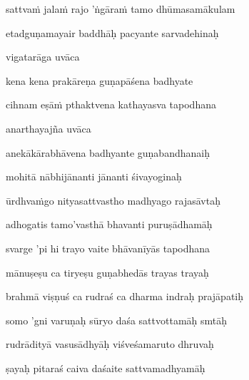 sattva\.m jala\.m rajo 'ṅgāra\.m tamo dhūmasamākulam\thinspace{\dandab} \dontdisplaylinenum

etadguṇamayair baddhāḥ pacyante sarvadehinaḥ \veg\dontdisplaylinenum

vigatarāga uvāca~{\dandab}\dontdisplaylinenum 

kena kena prakāreṇa guṇapāśena badhyate\thinspace{\danda} \dontdisplaylinenum

cihnam eṣā\.m pthaktvena kathayasva tapodhana \veg\dontdisplaylinenum

anarthayajña uvāca~{\dandab}\dontdisplaylinenum 

anekākārabhāvena badhyante guṇabandhanaiḥ\thinspace{\danda} \dontdisplaylinenum

mohitā nābhijānanti jānanti śivayoginaḥ \veg\dontdisplaylinenum

ūrdhva\.mgo nityasattvastho madhyago rajasāvtaḥ\thinspace{\dandab} \dontdisplaylinenum

adhogatis tamo'vasthā bhavanti puruṣādhamāḥ \veg\dontdisplaylinenum

svarge 'pi hi trayo vaite bhāvanīyās tapodhana\thinspace{\dandab} \dontdisplaylinenum

mānuṣeṣu ca tiryeṣu guṇabhedās trayas trayaḥ \veg\dontdisplaylinenum

brahmā viṣṇuś ca rudraś ca dharma indraḥ prajāpatiḥ\thinspace{\dandab} \dontdisplaylinenum

somo 'gni varuṇaḥ sūryo daśa sattvottamāḥ smtāḥ \veg\dontdisplaylinenum

rudrādityā vasusādhyāḥ viśveśamaruto dhruvaḥ\thinspace{\dandab} \dontdisplaylinenum

ṣayaḥ pitaraś caiva daśaite sattvamadhyamāḥ \veg\dontdisplaylinenum

